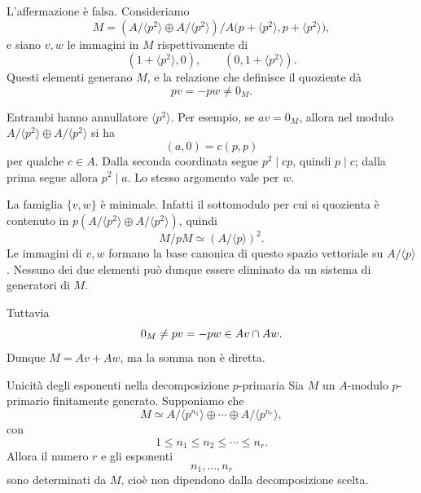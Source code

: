 \documentclass[a4paper]{article}
\begin{document}
\begin{radioactive}
\begin{snippetsolution}{}
    L'affermazione è falsa. Consideriamo
    \[
        M=
        \left(A/\langle p^2\rangle\oplus A/\langle p^2\rangle\right)
        \Big/
        A\bigl(p+\langle p^2\rangle,p+\langle p^2\rangle\bigr),
    \]
    e siano \(v,w\) le immagini in \(M\) rispettivamente di
    \[
        (1+\langle p^2\rangle,0),
        \qquad
        (0,1+\langle p^2\rangle).
    \]
    Questi elementi generano \(M\), e la relazione che definisce il
    quoziente dà
    \[
        pv=-pw\neq0_M.
    \]

    Entrambi hanno annullatore \(\langle p^2\rangle\). Per esempio, se
    \(av=0_M\), allora nel modulo
    \(A/\langle p^2\rangle\oplus A/\langle p^2\rangle\) si ha
    \[
        (a,0)=c(p,p)
    \]
    per qualche \(c\in A\). Dalla seconda coordinata segue
    \(p^2\mid cp\), quindi \(p\mid c\); dalla prima segue allora
    \(p^2\mid a\). Lo stesso argomento vale per \(w\).

    La famiglia \(\{v,w\}\) è minimale. Infatti il sottomodulo per cui
    si quozienta è contenuto in
    \(p(A/\langle p^2\rangle\oplus A/\langle p^2\rangle)\), quindi
    \[
        M/pM\simeq(A/\langle p\rangle)^2.
    \]
    Le immagini di \(v,w\) formano la base canonica di questo spazio
    vettoriale su \(A/\langle p\rangle\). Nessuno dei due elementi può
    dunque essere eliminato da un sistema di generatori di \(M\).

    Tuttavia
    \[
        0_M\neq pv=-pw\in Av\cap Aw.
    \]
    Dunque \(M=Av+Aw\), ma la somma non è diretta.
\end{snippetsolution}
\end{radioactive}

\begin{radioactive}
\begin{snippetproposition}{Unicità degli esponenti nella decomposizione \(p\)-primaria}
    Sia \(M\) un \(A\)-modulo \(p\)-primario finitamente generato. Supponiamo che
    \[
        M\simeq
        A/\langle p^{n_1} \rangle\oplus\cdots\oplus A/\langle p^{n_r} \rangle,
    \]
    con
    \[
        1\leq n_1\leq n_2\leq\cdots\leq n_r.
    \]
    Allora il numero \(r\) e gli esponenti
    \[
        n_1,\ldots,n_r
    \]
    sono determinati da \(M\), cioè non dipendono dalla decomposizione scelta.
\end{snippetproposition}
\end{radioactive}
\end{document}
